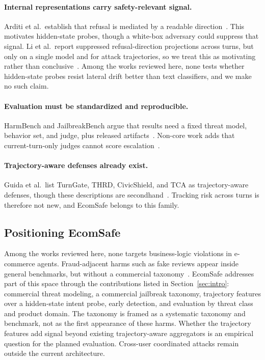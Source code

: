 \documentclass[sigconf]{acmart}
\begin{document}
\paragraph{Internal representations carry safety-relevant signal.}
Arditi et al.\ establish that refusal is mediated by a readable direction~\cite{arditi2024refusal}. This motivates hidden-state probes, though a white-box adversary could suppress that signal. Li et al.\ report suppressed refusal-direction projections across turns, but only on a single model and for attack trajectories, so we treat this as motivating rather than conclusive~\cite{li2026state}. Among the works reviewed here, none tests whether hidden-state probes resist lateral drift better than text classifiers, and we make no such claim.

\paragraph{Evaluation must be standardized and reproducible.}
HarmBench and JailbreakBench argue that results need a fixed threat model, behavior set, and judge, plus released artifacts~\cite{mazeika2024harmbench,chao2024jailbreakbench}. Non-core work adds that current-turn-only judges cannot score escalation~\cite{sheoran2026multiturnpsb}.

\paragraph{Trajectory-aware defenses already exist.}
Guida et al.\ list TurnGate, THRD, CivicShield, and TCA as trajectory-aware defenses, though these descriptions are secondhand~\cite{guida2026cognitive}. Tracking risk across turns is therefore not new, and EcomSafe belongs to this family.

\subsection{Positioning EcomSafe}
\label{sec:rw-position}

Among the works reviewed here, none targets business-logic violations in e-commerce agents. Fraud-adjacent harms such as fake reviews appear inside general benchmarks, but without a commercial taxonomy~\cite{li2026state}. EcomSafe addresses part of this space through the contributions listed in Section~\ref{sec:intro}: commercial threat modeling, a commercial jailbreak taxonomy, trajectory features over a hidden-state intent probe, early detection, and evaluation by threat class and product domain. The taxonomy is framed as a systematic taxonomy and benchmark, not as the first appearance of these harms. Whether the trajectory features add signal beyond existing trajectory-aware aggregators is an empirical question for the planned evaluation. Cross-user coordinated attacks remain outside the current architecture.
\end{document}
